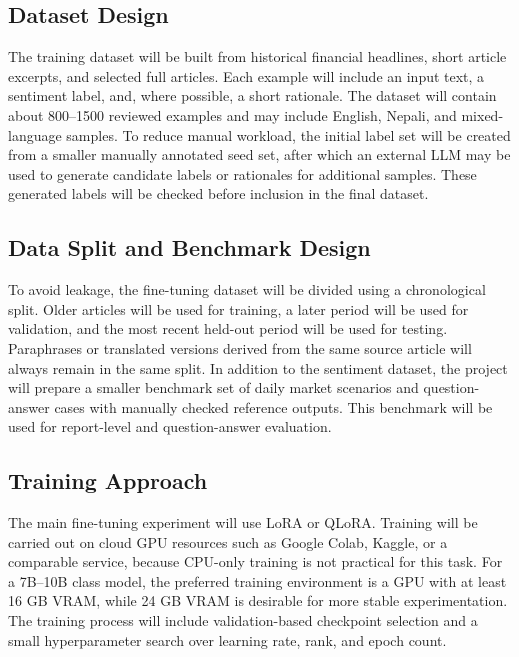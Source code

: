 \documentclass[12pt,a4paper]{report}
\begin{document}
\subsection{Dataset Design}
The training dataset will be built from historical financial headlines, short article excerpts, and selected full articles. Each example will include an input text, a sentiment label, and, where possible, a short rationale. The dataset will contain about 800--1500 reviewed examples and may include English, Nepali, and mixed-language samples. To reduce manual workload, the initial label set will be created from a smaller manually annotated seed set, after which an external \ac{LLM} may be used to generate candidate labels or rationales for additional samples. These generated labels will be checked before inclusion in the final dataset.

\subsection{Data Split and Benchmark Design}
To avoid leakage, the fine-tuning dataset will be divided using a chronological split. Older articles will be used for training, a later period will be used for validation, and the most recent held-out period will be used for testing. Paraphrases or translated versions derived from the same source article will always remain in the same split. In addition to the sentiment dataset, the project will prepare a smaller benchmark set of daily market scenarios and question-answer cases with manually checked reference outputs. This benchmark will be used for report-level and question-answer evaluation.

\subsection{Training Approach}
The main fine-tuning experiment will use LoRA or \ac{QLoRA}. Training will be carried out on cloud GPU resources such as Google Colab, Kaggle, or a comparable service, because CPU-only training is not practical for this task. For a 7B--10B class model, the preferred training environment is a GPU with at least 16 GB VRAM, while 24 GB VRAM is desirable for more stable experimentation. The training process will include validation-based checkpoint selection and a small hyperparameter search over learning rate, rank, and epoch count.
\end{document}
